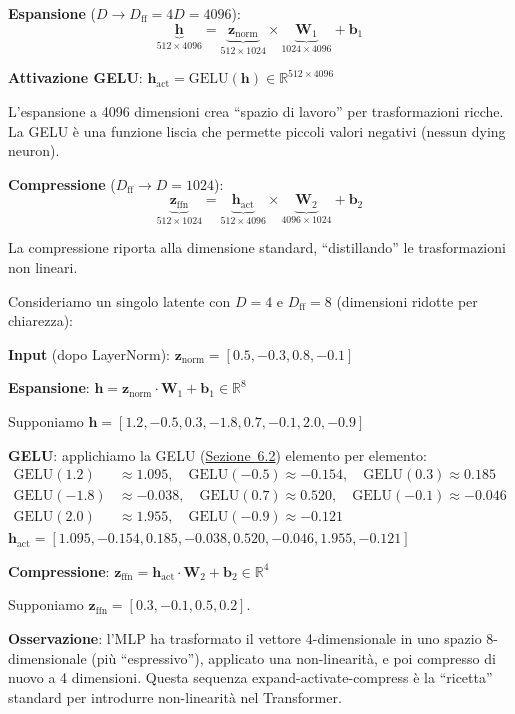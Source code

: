 \documentclass[12pt,a4paper]{article}
\begin{document}
\begin{formulabox}
\textbf{Espansione} ($D \to D_{\text{ff}} = 4D = 4096$):
\[
\underbrace{\mathbf{h}}_{512 \times 4096} = \underbrace{\mathbf{z}_{\text{norm}}}_{512 \times 1024} \times \underbrace{\mathbf{W}_1}_{1024 \times 4096} + \mathbf{b}_1
\]

\textbf{Attivazione GELU}: $\mathbf{h}_{\text{act}} = \text{GELU}(\mathbf{h}) \in \mathbb{R}^{512 \times 4096}$

L'espansione a 4096 dimensioni crea ``spazio di lavoro'' per trasformazioni ricche. La GELU \`e una funzione liscia che permette piccoli valori negativi (nessun dying neuron).

\textbf{Compressione} ($D_{\text{ff}} \to D = 1024$):
\[
\underbrace{\mathbf{z}_{\text{ffn}}}_{512 \times 1024} = \underbrace{\mathbf{h}_{\text{act}}}_{512 \times 4096} \times \underbrace{\mathbf{W}_2}_{4096 \times 1024} + \mathbf{b}_2
\]

La compressione riporta alla dimensione standard, ``distillando'' le trasformazioni non lineari.
\end{formulabox}

\begin{examplebox}
Consideriamo un singolo latente con $D = 4$ e $D_{\text{ff}} = 8$ (dimensioni ridotte per chiarezza):

\textbf{Input} (dopo LayerNorm): $\mathbf{z}_{\text{norm}} = [0.5, -0.3, 0.8, -0.1]$

\textbf{Espansione}: $\mathbf{h} = \mathbf{z}_{\text{norm}} \cdot \mathbf{W}_1 + \mathbf{b}_1 \in \mathbb{R}^{8}$

Supponiamo $\mathbf{h} = [1.2, -0.5, 0.3, -1.8, 0.7, -0.1, 2.0, -0.9]$

\textbf{GELU}: applichiamo la GELU (\hyperref[sec:gelu]{Sezione~6.2}) elemento per elemento:
\begin{align*}
    \text{GELU}(1.2) &\approx 1.095, \quad \text{GELU}(-0.5) \approx -0.154, \quad \text{GELU}(0.3) \approx 0.185 \\
    \text{GELU}(-1.8) &\approx -0.038, \quad \text{GELU}(0.7) \approx 0.520, \quad \text{GELU}(-0.1) \approx -0.046 \\
    \text{GELU}(2.0) &\approx 1.955, \quad \text{GELU}(-0.9) \approx -0.121
\end{align*}
$\mathbf{h}_{\text{act}} = [1.095, -0.154, 0.185, -0.038, 0.520, -0.046, 1.955, -0.121]$

\textbf{Compressione}: $\mathbf{z}_{\text{ffn}} = \mathbf{h}_{\text{act}} \cdot \mathbf{W}_2 + \mathbf{b}_2 \in \mathbb{R}^{4}$

Supponiamo $\mathbf{z}_{\text{ffn}} = [0.3, -0.1, 0.5, 0.2]$.

\textbf{Osservazione}: l'MLP ha trasformato il vettore 4-dimensionale in uno spazio 8-dimensionale (pi\`u ``espressivo''), applicato una non-linearit\`a, e poi compresso di nuovo a 4 dimensioni. Questa sequenza expand-activate-compress \`e la ``ricetta'' standard per introdurre non-linearit\`a nel Transformer.
\end{examplebox}
\end{document}
